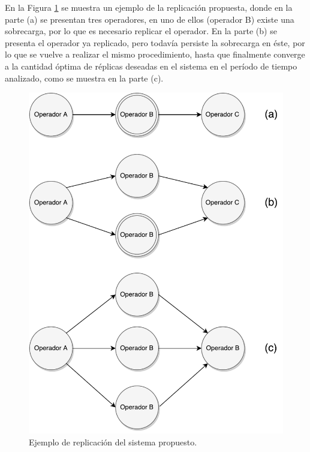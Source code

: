 En la Figura \ref{fig:ejReplicacion} se muestra un ejemplo de la replicación propuesta, donde en la parte (a) se presentan tres operadores, en uno de ellos (operador B) existe una sobrecarga, por lo que es necesario replicar el operador. En la parte (b) se presenta el operador ya replicado, pero todavía persiste la sobrecarga en éste, por lo que se vuelve a realizar el mismo procedimiento, hasta que finalmente converge a la cantidad óptima de réplicas deseadas en el sistema en el período de tiempo analizado, como se muestra en la parte (c).

\begin{figure}[!hb]
	\centering
		\includegraphics[scale=0.6]{images/EjReplicacion.pdf}
	\caption{Ejemplo de replicación del sistema propuesto.}
	\label{fig:ejReplicacion}
\end{figure}

